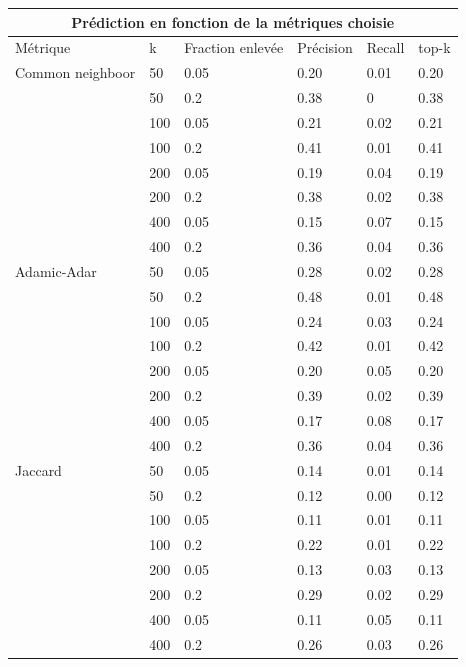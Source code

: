 \documentclass{article}
\begin{document}
\begin{tabular}{ |p{4cm}||p{1cm}|p{3.2cm}|p{1.8cm}|p{1.1cm}|p{1.1cm}|  }
    \hline
    \multicolumn{6}{|c|}{Prédiction en fonction de la métriques choisie} \\
    \hline
    Métrique & k & Fraction enlevée & Précision & Recall & top-k \\
    \hline
    Common neighboor & 50  & 0.05 & 0.20 & 0.01 & 0.20 \\
                     & 50  & 0.2  & 0.38 & 0    & 0.38 \\
                     & 100 & 0.05 & 0.21 & 0.02 & 0.21 \\
                     & 100 & 0.2  & 0.41 & 0.01 & 0.41 \\
                     & 200 & 0.05 & 0.19 & 0.04 & 0.19 \\
                     & 200 & 0.2  & 0.38 & 0.02 & 0.38 \\
                     & 400 & 0.05 & 0.15 & 0.07 & 0.15 \\
                     & 400 & 0.2  & 0.36 & 0.04 & 0.36 \\
    \hhline{|=|=|=|=|=|=|}
    Adamic-Adar      & 50 & 0.05  & 0.28 & 0.02 & 0.28 \\
                     & 50 & 0.2   & 0.48 & 0.01 & 0.48 \\
                     & 100 & 0.05 & 0.24 & 0.03 & 0.24 \\
                     & 100 & 0.2  & 0.42 & 0.01 & 0.42 \\
                     & 200 & 0.05 & 0.20 & 0.05 & 0.20 \\
                     & 200 & 0.2  & 0.39 & 0.02 & 0.39 \\
                     & 400 & 0.05 & 0.17 & 0.08 & 0.17 \\
                     & 400 & 0.2  & 0.36 & 0.04 & 0.36 \\
    \hhline{|=|=|=|=|=|=|}
    Jaccard          & 50  & 0.05 & 0.14 & 0.01 & 0.14 \\
                     & 50  & 0.2  & 0.12 & 0.00 & 0.12 \\
                     & 100 & 0.05 & 0.11 & 0.01 & 0.11 \\
                     & 100 & 0.2  & 0.22 & 0.01 & 0.22 \\
                     & 200 & 0.05 & 0.13 & 0.03 & 0.13 \\
                     & 200 & 0.2  & 0.29 & 0.02 & 0.29 \\
                     & 400 & 0.05 & 0.11 & 0.05 & 0.11 \\
                     & 400 & 0.2  & 0.26 & 0.03 & 0.26 \\
    \hline
\end{tabular}
\end{document}
